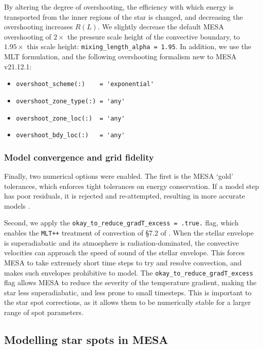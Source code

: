 By altering the degree of overshooting, the efficiency with which energy is transported from the inner regions of the star is changed, and decreasing the overshooting increases $R(L)$. We slightly decrease the default MESA overshooting of $2\times$ the pressure scale height of the convective boundary, to $1.95\times$ this scale height: \lstinline{mixing_length_alpha = 1.95}. In addition, we use the \citet{henyay1965} MLT formulation, and the following overshooting formalism new to MESA v21.12.1:
\begin{itemize}
    \setlength\itemsep{0em}
    \item \lstinline{overshoot_scheme(:)    = 'exponential'}
    \item \lstinline{overshoot_zone_type(:) = 'any'}
    \item \lstinline{overshoot_zone_loc(:)  = 'any'}
    \item \lstinline{overshoot_bdy_loc(:)   = 'any'}
\end{itemize}

\subsubsection{Model convergence and grid fidelity}

Finally, two numerical options were enabled.
The first is the MESA `gold' tolerances, which enforces tight tolerances on energy conservation. If a model step has poor residuals, it is rejected and re-attempted, resulting in more accurate models \citep{paxton2019}.

Second, we apply the \lstinline{okay_to_reduce_gradT_excess = .true.} flag, which enables the \lstinline{MLT++} treatment of convection of \S7.2 of \citet{paxton2013}.
When the stellar envelope is superadiabatic and its atmosphere is radiation-dominated, the convective velocities can approach the speed of sound of the stellar envelope. This forces MESA to take extremely short time steps to try and resolve convection, and makes such envelopes prohibitive to model. The \lstinline{okay_to_reduce_gradT_excess} flag allows MESA to reduce the severity of the temperature gradient, making the star less superadiabatic, and less prone to small timesteps. This is important to the star spot corrections, as it allows them to be numerically stable for a larger range of spot parameters.


\subsection{Modelling star spots in MESA}
\label{sect:modelling:starspots in MESA}

